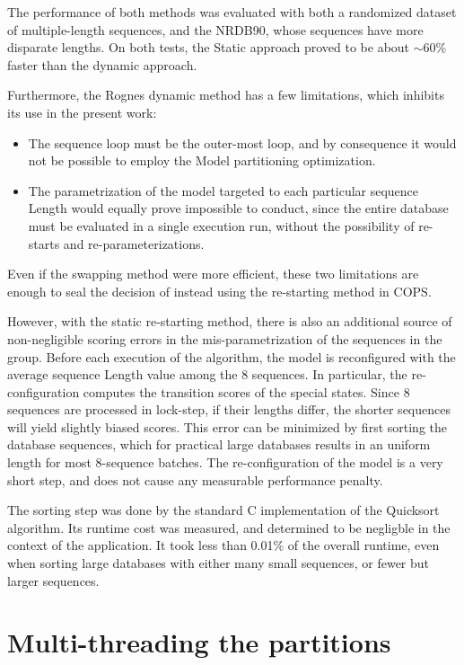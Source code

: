 The performance of both methods was evaluated with both a randomized dataset of multiple-length sequences, and the NRDB90, whose sequences have more disparate lengths. On both tests, the Static approach proved to be about $\sim$60\% faster than the dynamic approach.

Furthermore, the Rognes dynamic method has a few limitations, which inhibits its use in the present work:

\begin{itemize}[noitemsep,nolistsep]
\item The sequence loop must be the outer-most loop, and by consequence it would not be possible to employ the Model partitioning optimization.
\item The parametrization of the model targeted to each particular sequence Length would equally prove impossible to conduct, since the entire database must be evaluated in a single execution run, without the possibility of re-starts and re-parameterizations.
\end{itemize}

Even if the swapping method were more efficient, these two limitations are enough to seal the decision of instead using the re-starting method in COPS.

However, with the static re-starting method, there is also an additional source of non-negligible scoring errors in the mis-parametrization of the sequences in the group. Before each execution of the algorithm, the model is reconfigured with the average sequence Length value among the 8 sequences. In particular, the re-configuration computes the transition scores of the special states. Since 8 sequences are processed in lock-step, if their lengths differ, the shorter sequences will yield slightly biased scores. This error can be minimized by first sorting the database sequences, which for practical large databases results in an uniform length for most 8-sequence batches. The re-configuration of the model is a very short step, and does not cause any measurable performance penalty.

The sorting step was done by the standard C implementation of the Quicksort algorithm. Its runtime cost was measured, and determined to be negligble in the context of the application. It took less than 0.01\% of the overall runtime, even when sorting large databases with either many small sequences, or fewer but larger sequences.





\section{Multi-threading the partitions}
\label{Multi-threading the partitions}

